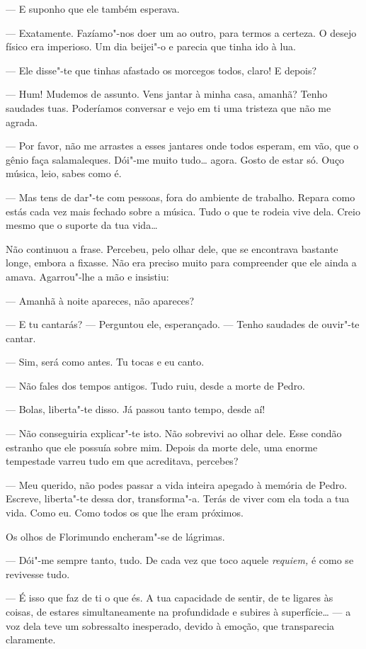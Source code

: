 --- E suponho que ele também esperava.

--- Exatamente. Fazíamo"-nos doer um ao outro, para termos a certeza. O
desejo físico era imperioso. Um dia beijei"-o e parecia que tinha ido à
lua.

--- Ele disse"-te que tinhas afastado os morcegos todos, claro! E depois?

--- Hum! Mudemos de assunto. Vens jantar à minha casa, amanhã? Tenho
saudades tuas. Poderíamos conversar e vejo em ti uma tristeza que não me
agrada.

--- Por favor, não me arrastes a esses jantares onde todos esperam, em
vão, que o gênio faça salamaleques. Dói"-me muito tudo\ldots{} agora. Gosto de
estar só. Ouço música, leio, sabes como é.

--- Mas tens de dar"-te com pessoas, fora do ambiente de trabalho. Repara
como estás cada vez mais fechado sobre a música. Tudo o que te rodeia
vive dela. Creio mesmo que o suporte da tua vida\ldots{}

Não continuou a frase. Percebeu, pelo olhar dele, que se encontrava
bastante longe, embora a fixasse. Não era preciso muito para compreender
que ele ainda a amava. Agarrou"-lhe a mão e insistiu:

--- Amanhã à noite apareces, não apareces?

--- E tu cantarás? --- Perguntou ele, esperançado. --- Tenho saudades de
ouvir"-te cantar.

--- Sim, será como antes. Tu tocas e eu canto.

--- Não fales dos tempos antigos. Tudo ruiu, desde a morte de Pedro.

--- Bolas, liberta"-te disso. Já passou tanto tempo, desde aí!

--- Não conseguiria explicar"-te isto. Não sobrevivi ao olhar dele. Esse
condão estranho que ele possuía sobre mim. Depois da morte dele, uma
enorme tempestade varreu tudo em que acreditava, percebes?

--- Meu querido, não podes passar a vida inteira apegado à memória de
Pedro. Escreve, liberta"-te dessa dor, transforma"-a. Terás de viver com
ela toda a tua vida. Como eu. Como todos os que lhe eram próximos.

Os olhos de Florimundo encheram"-se de lágrimas.

--- Dói"-me sempre tanto, tudo. De cada vez que toco aquele \emph{requiem,}
é como se revivesse tudo.

--- É isso que faz de ti o que és. A tua capacidade de sentir, de te
ligares às coisas, de estares simultaneamente na profundidade e subires
à superfície\ldots{} --- a voz dela teve um sobressalto inesperado, devido à
emoção, que transparecia claramente.

